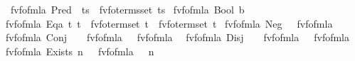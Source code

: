 \begin{isabellebody}
\ \ {\isachardoublequoteopen}fv{\isacharunderscore}{\kern0pt}fo{\isacharunderscore}{\kern0pt}fmla\ {\isacharparenleft}{\kern0pt}Pred\ {\isacharunderscore}{\kern0pt}\ ts{\isacharparenright}{\kern0pt}\ {\isacharequal}{\kern0pt}\ fv{\isacharunderscore}{\kern0pt}fo{\isacharunderscore}{\kern0pt}terms{\isacharunderscore}{\kern0pt}set\ ts{\isachardoublequoteclose}\isanewline
{\isacharbar}{\kern0pt}\ {\isachardoublequoteopen}fv{\isacharunderscore}{\kern0pt}fo{\isacharunderscore}{\kern0pt}fmla\ {\isacharparenleft}{\kern0pt}Bool\ b{\isacharparenright}{\kern0pt}\ {\isacharequal}{\kern0pt}\ {\isacharbraceleft}{\kern0pt}{\isacharbraceright}{\kern0pt}{\isachardoublequoteclose}\isanewline
{\isacharbar}{\kern0pt}\ {\isachardoublequoteopen}fv{\isacharunderscore}{\kern0pt}fo{\isacharunderscore}{\kern0pt}fmla\ {\isacharparenleft}{\kern0pt}Eqa\ t\ t{\isacharprime}{\kern0pt}{\isacharparenright}{\kern0pt}\ {\isacharequal}{\kern0pt}\ fv{\isacharunderscore}{\kern0pt}fo{\isacharunderscore}{\kern0pt}term{\isacharunderscore}{\kern0pt}set\ t\ {\isasymunion}\ fv{\isacharunderscore}{\kern0pt}fo{\isacharunderscore}{\kern0pt}term{\isacharunderscore}{\kern0pt}set\ t{\isacharprime}{\kern0pt}{\isachardoublequoteclose}\isanewline
{\isacharbar}{\kern0pt}\ {\isachardoublequoteopen}fv{\isacharunderscore}{\kern0pt}fo{\isacharunderscore}{\kern0pt}fmla\ {\isacharparenleft}{\kern0pt}Neg\ {\isasymphi}{\isacharparenright}{\kern0pt}\ {\isacharequal}{\kern0pt}\ fv{\isacharunderscore}{\kern0pt}fo{\isacharunderscore}{\kern0pt}fmla\ {\isasymphi}{\isachardoublequoteclose}\isanewline
{\isacharbar}{\kern0pt}\ {\isachardoublequoteopen}fv{\isacharunderscore}{\kern0pt}fo{\isacharunderscore}{\kern0pt}fmla\ {\isacharparenleft}{\kern0pt}Conj\ {\isasymphi}\ {\isasympsi}{\isacharparenright}{\kern0pt}\ {\isacharequal}{\kern0pt}\ fv{\isacharunderscore}{\kern0pt}fo{\isacharunderscore}{\kern0pt}fmla\ {\isasymphi}\ {\isasymunion}\ fv{\isacharunderscore}{\kern0pt}fo{\isacharunderscore}{\kern0pt}fmla\ {\isasympsi}{\isachardoublequoteclose}\isanewline
{\isacharbar}{\kern0pt}\ {\isachardoublequoteopen}fv{\isacharunderscore}{\kern0pt}fo{\isacharunderscore}{\kern0pt}fmla\ {\isacharparenleft}{\kern0pt}Disj\ {\isasymphi}\ {\isasympsi}{\isacharparenright}{\kern0pt}\ {\isacharequal}{\kern0pt}\ fv{\isacharunderscore}{\kern0pt}fo{\isacharunderscore}{\kern0pt}fmla\ {\isasymphi}\ {\isasymunion}\ fv{\isacharunderscore}{\kern0pt}fo{\isacharunderscore}{\kern0pt}fmla\ {\isasympsi}{\isachardoublequoteclose}\isanewline
{\isacharbar}{\kern0pt}\ {\isachardoublequoteopen}fv{\isacharunderscore}{\kern0pt}fo{\isacharunderscore}{\kern0pt}fmla\ {\isacharparenleft}{\kern0pt}Exists\ n\ {\isasymphi}{\isacharparenright}{\kern0pt}\ {\isacharequal}{\kern0pt}\ fv{\isacharunderscore}{\kern0pt}fo{\isacharunderscore}{\kern0pt}fmla\ {\isasymphi}\ {\isacharminus}{\kern0pt}\ {\isacharbraceleft}{\kern0pt}n{\isacharbraceright}{\kern0pt}{\isachardoublequoteclose}\isanewline

\end{isabellebody}
